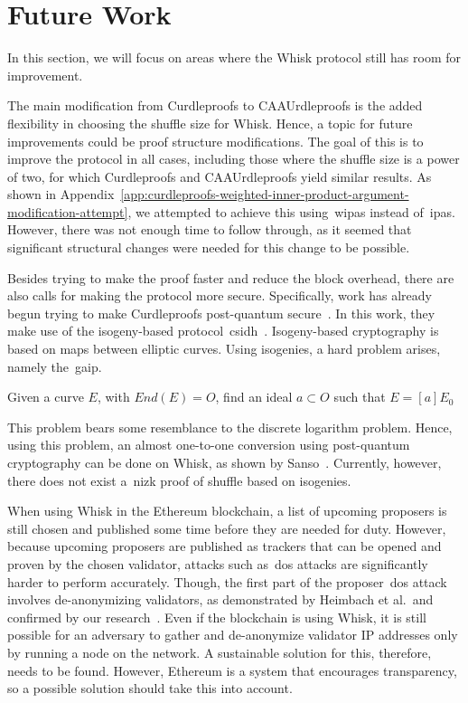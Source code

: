 \section{Future Work}\label{sec:future-works}
In this section, we will focus on areas where the Whisk protocol still has room for improvement.

The main modification from Curdleproofs to CAAUrdleproofs is the added flexibility in choosing the shuffle size for Whisk.
Hence, a topic for future improvements could be proof structure modifications.
The goal of this is to improve the protocol in all cases, including those where the shuffle size is a power of two, for which Curdleproofs and CAAUrdleproofs yield similar results.
As shown in Appendix~\ref{app:curdleproofs-weighted-inner-product-argument-modification-attempt}, we attempted to achieve this using~\glspl{wipa} instead of~\glspl{ipa}.
However, there was not enough time to follow through, as it seemed that significant structural changes were needed for this change to be possible.


Besides trying to make the proof faster and reduce the block overhead, there are also calls for making the protocol more secure.
Specifically, work has already begun trying to make Curdleproofs post-quantum secure~\cite{pqwhisk}.
In this work, they make use of the isogeny-based protocol~\gls{csidh}~\cite{10.1007/978-3-030-03332-3_15}.
Isogeny-based cryptography is based on maps between elliptic curves.
Using isogenies, a hard problem arises, namely the~\gls{gaip}.
\begin{definition}
    Given a curve $E$, with $End(E)=O$, find an ideal $a\subset O$ such that $E=[a]E_0$
\end{definition}
This problem bears some resemblance to the discrete logarithm problem.
Hence, using this problem, an almost one-to-one conversion using post-quantum cryptography can be done on Whisk, as shown by Sanso~\cite{pqwhisk}.
Currently, however, there does not exist a~\gls{nizk} proof of shuffle based on isogenies.


When using Whisk in the Ethereum blockchain, a list of upcoming proposers is still chosen and published some time before they are needed for duty.
However, because upcoming proposers are published as trackers that can be opened and proven by the chosen validator, attacks such as~\gls{dos} attacks are significantly harder to perform accurately.
Though, the first part of the proposer~\gls{dos} attack involves de-anonymizing validators, as demonstrated by Heimbach et al.~and confirmed by our research~\cite{heimbach2024deanonymizingethereumvalidatorsp2p,ouroldpaper}.
Even if the blockchain is using Whisk, it is still possible for an adversary to gather and de-anonymize validator IP addresses only by running a node on the network.
A sustainable solution for this, therefore, needs to be found.
However, Ethereum is a system that encourages transparency, so a possible solution should take this into account.
